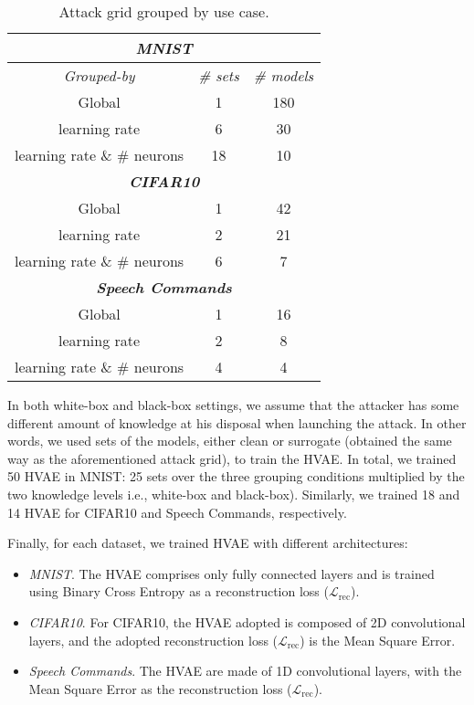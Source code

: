 \begin{table}[!htpb]
\centering
\footnotesize
\caption{Attack grid grouped by use case. }
\begin{tabular}{ccc} \toprule
\multicolumn{3}{c}{\textit{\textbf{MNIST}}} \\ \midrule
    \textit{Grouped-by} & \textit{\# sets} & \textit{\# models}\\ \hline
    Global &     1    &  180 \\
    learning rate &     6  &  30   \\
    learning rate \& $\#$ neurons &  18 &  10\\ \midrule
    \multicolumn{3}{c}{\textit{\textbf{CIFAR10}}} \\ \midrule
    Global &  1  &  42 \\
    learning rate &  2   & 21\\
    learning rate \& $\#$ neurons &    6    &   7 \\ \midrule
    \multicolumn{3}{c}{\textit{\textbf{Speech Commands}}} \\ \midrule
    Global &     1   &  16\\
    learning rate &   2  &  8 \\ 
    learning rate \& $\#$ neurons &    4   &  4  \\ \bottomrule
\end{tabular}
\label{tab.grid}
\end{table}
\par
In both white-box and black-box settings, we assume that the attacker has some different amount of knowledge at his disposal when launching the attack.
In other words, we used sets of the models, either clean or surrogate (obtained the same way as the aforementioned attack grid), to train the HVAE.
In total, we trained 50 HVAE in MNIST: 25 sets over the three grouping conditions multiplied by the two knowledge levels i.e., white-box and black-box).
Similarly, we trained 18 and 14 HVAE for CIFAR10 and Speech Commands, respectively. 
\par
Finally, for each dataset, we trained HVAE with different architectures: 
\begin{itemize}
    \item \textit{MNIST}. The HVAE comprises only fully connected layers and is trained using Binary Cross Entropy as a reconstruction loss ($\mathcal{L}_{\mathrm{rec}}$). 
    \item \textit{CIFAR10}. For CIFAR10, the HVAE adopted is composed of 2D convolutional layers, and the adopted reconstruction loss ($\mathcal{L}_{\mathrm{rec}}$) is the Mean Square Error.
    \item \textit{Speech Commands}. The HVAE are made of 1D convolutional layers, with the Mean Square Error as the reconstruction loss ($\mathcal{L}_{\mathrm{rec}}$).
\end{itemize}

